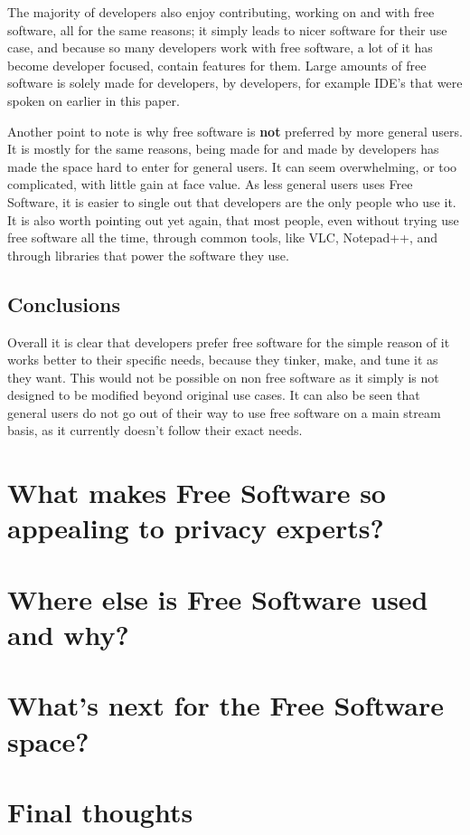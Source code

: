 \documentclass[a4paper,12pt]{article}
\begin{document}
{The majority of developers also enjoy contributing, working on and with free software, all for the same reasons;
it simply leads to nicer software for their use case, and because so many developers work with free software, 
a lot of it has become developer focused, contain features for them. Large amounts of free software is solely 
made for developers, by developers, for example IDE's that were spoken on earlier in this paper.

Another point to note is why free software is \textbf{not} preferred by more general users. It is mostly for the
same reasons, being made for and made by developers has made the space hard to enter for general users. It 
can seem overwhelming, or too complicated, with little gain at face value. As less general users uses Free 
Software, it is easier to single out that developers are the only people who use it. It is also worth pointing
out yet again, that most people, even without trying use free software all the time, through common tools, like 
VLC, Notepad++, and through libraries that power the software they use.

\subsection{Conclusions}
Overall it is clear that developers prefer free software for the simple reason of it works better to their 
specific needs, because they tinker, make, and tune it as they want. This would not be possible on non free software
as it simply is not designed to be modified beyond original use cases. It can also be seen that general users do
not go out of their way to use free software on a main stream basis, as it currently doesn't follow their exact needs.

\section{What makes Free Software so appealing to privacy experts?} 
\section{Where else is Free Software used and why?} 
\section{What's next for the Free Software space?} 
\section{Final thoughts}

\newpage 
\printbibliography 
} 
\end{document}

